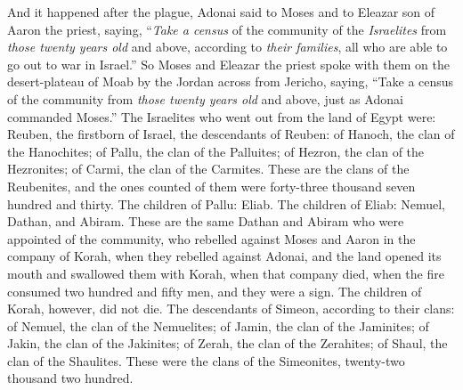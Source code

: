 \begin{biblechapter} %
  And it happened after the plague, Adonai said to Moses and to Eleazar son of Aaron the priest, saying,
\verse “\textit{Take a census} of the community of the \textit{Israelites} from \textit{those twenty years old} and above, according to \textit{their families}, all who are able to go out to war in Israel.”
\verse So Moses and Eleazar the priest spoke with them on the desert-plateau of Moab by the Jordan across from Jericho, saying,
\verse “Take a census of the community from \textit{those twenty years old} and above, just as Adonai commanded Moses.” The Israelites who went out from the land of Egypt were:
\verse Reuben, the firstborn of Israel, the descendants of Reuben: of Hanoch, the clan of the Hanochites; of Pallu, the clan of the Palluites;
\verse of Hezron, the clan of the Hezronites; of Carmi, the clan of the Carmites.
\verse These are the clans of the Reubenites, and the ones counted of them were forty-three thousand seven hundred and thirty.
\verse The children of Pallu: Eliab.
\verse The children of Eliab: Nemuel, Dathan, and Abiram. These are the same Dathan and Abiram who were appointed of the community, who rebelled against Moses and Aaron in the company of Korah, when they rebelled against Adonai,
\verse and the land opened its mouth and swallowed them with Korah, when that company died, when the fire consumed two hundred and fifty men, and they were a sign.
\verse The children of Korah, however, did not die.
\verse The descendants of Simeon, according to their clans: of Nemuel, the clan of the Nemuelites; of Jamin, the clan of the Jaminites; of Jakin, the clan of the Jakinites;
\verse of Zerah, the clan of the Zerahites; of Shaul, the clan of the Shaulites.
\verse These were the clans of the Simeonites, twenty-two thousand two hundred.

\end{biblechapter}
